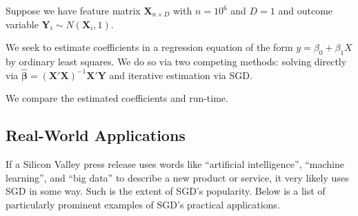 \documentclass{article}
\begin{document}
Suppose we have feature matrix $\bm{X}_{n \times D}$ with $n=10^6$ and $D=1$
and outcome variable $\bm{Y}_i \sim N(\bm{X}_i,1)$. 

We seek to estimate coefficients in a
regression equation of the form $y = \beta_0 + \beta_1 X$ by ordinary least
squares. We do so via two
competing methods: solving directly via $\hat{\bm{\beta}} =
(\bm{X}'\bm{X})^{-1}\bm{X}'\bm{Y}$ and iterative estimation via SGD.

We compare the estimated coefficients and run-time.
\subsection{Real-World Applications}

If a Silicon Valley press release uses words like ``artificial intelligence'',
``machine learning'', and ``big data'' to describe a new product or service, it very likely
uses SGD in some way. Such is the extent of SGD's popularity. 
Below is a list of particularly prominent examples of SGD's practical
applications.
\end{document}
